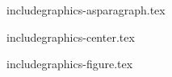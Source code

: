 \documentclass{cursuspresentatie}
\def\importslide#1#2{%
	{#2}
}
\begin{document}

\importslide{images}{includegraphics-asparagraph.tex}
\importslide{images}{includegraphics-center.tex}
\importslide{images}{includegraphics-figure.tex}

\end{document}
